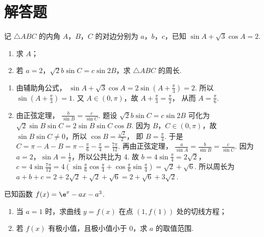 \section{解答题}

\begin{problem}
记 \(\triangle ABC\) 的内角 \(A\)，\(B\)，\(C\) 的对边分别为 \(a\)，\(b\)，\(c\)，已知 \(\sin A+\sqrt3\cos A=2\).
\begin{enumerate}
\item 求 \(A\)；
\item 若 \(a=2\)，\(\sqrt2 b\sin C=c\sin 2B\)，求 \(\triangle ABC\) 的周长.
\end{enumerate}
\end{problem}

\begin{solution}
\begin{enumerate}
\item 由辅助角公式，
\(\sin A+\sqrt3\cos A=2\sin\left(A+\frac{\pi}{3}\right)=2\).
所以
\(\sin\left(A+\frac{\pi}{3}\right)=1\).
又 \(A\in(0,\pi)\)，故
\(A+\frac{\pi}{3}=\frac{\pi}{2}\)，
从而
\(A=\frac{\pi}{6}\).

\item 由正弦定理，
\(\frac{b}{\sin B}=\frac{c}{\sin C}\).
题设
\(\sqrt2 b\sin C=c\sin 2B\)
可化为
\(\sqrt2\sin B\sin C=2\sin B\sin C\cos B\).
因为 \(B\)，\(C\in(0,\pi)\)，故 \(\sin B\sin C\ne 0\)，所以
\(\cos B=\frac{\sqrt2}{2}\)，
即
\(B=\frac{\pi}{4}\).
于是
\(C=\pi-A-B=\pi-\frac{\pi}{6}-\frac{\pi}{4}=\frac{7\pi}{12}\).
再由正弦定理，
\(\frac{a}{\sin A}=\frac{b}{\sin B}=\frac{c}{\sin C}\).
因为 \(a=2\)，\(\sin A=\frac12\)，所以公共比为 4. 故
\(b=4\sin\frac{\pi}{4}=2\sqrt2\)，
\(c=4\sin\frac{7\pi}{12} =4\left(\sin\frac{\pi}{6}\cos\frac{\pi}{4}+\cos\frac{\pi}{6}\sin\frac{\pi}{4}\right) =\sqrt2+\sqrt6\).
所以周长为
\(a+b+c=2+2\sqrt2+\sqrt2+\sqrt6=2+\sqrt6+3\sqrt2\).
\end{enumerate}
\end{solution}

\begin{problem}
已知函数 \(f(x)=\e^x-ax-a^3\).
\begin{enumerate}
\item 当 \(a=1\) 时，求曲线 \(y=f(x)\) 在点 \((1,f(1))\) 处的切线方程；
\item 若 \(f(x)\) 有极小值，且极小值小于 0，求 \(a\) 的取值范围.
\end{enumerate}
\end{problem}


